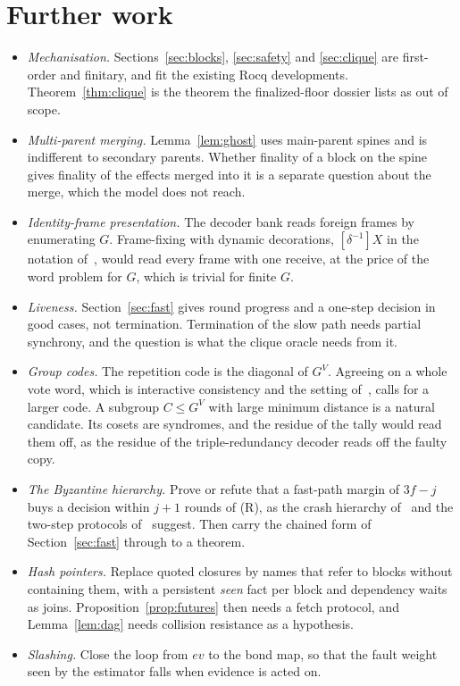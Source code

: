 \documentclass[11pt]{article}
\theoremstyle{definition}
\theoremstyle{remark}
\newcommand{\fr}[2]{[#1]#2}
\begin{document}
\section{Further work}\label{sec:further}

\begin{itemize}[leftmargin=1.5em]
\item \emph{Mechanisation.} Sections~\ref{sec:blocks}, \ref{sec:safety} and
  \ref{sec:clique} are first-order and finitary, and fit the existing Rocq
  developments. Theorem~\ref{thm:clique} is the theorem the finalized-floor
  dossier lists as out of scope.
\item \emph{Multi-parent merging.} Lemma~\ref{lem:ghost} uses main-parent
  spines and is indifferent to secondary parents. Whether finality of a block
  on the spine gives finality of the effects merged into it is a separate
  question about the merge, which the model does not reach.
\item \emph{Identity-frame presentation.} The decoder bank reads foreign frames
  by enumerating $G$. Frame-fixing with dynamic decorations,
  $\fr{\delta^{-1}}{X}$ in the notation of~\cite[\S7]{oriented}, would read
  every frame with one receive, at the price of the word problem for $G$,
  which is trivial for finite $G$.
\item \emph{Liveness.} Section~\ref{sec:fast} gives round progress and a
  one-step decision in good cases, not termination. Termination of the slow
  path needs partial synchrony, and the question is what the clique oracle
  needs from it.
\item \emph{Group codes.} The repetition code is the diagonal of
  $G^V$. Agreeing on a whole vote word, which is interactive consistency and
  the setting of~\cite{fmrr}, calls for a larger code. A subgroup
  $C\le G^V$ with large minimum distance is a natural candidate. Its cosets
  are syndromes, and the residue of the tally would read them off, as the
  residue of the triple-redundancy decoder reads off the faulty copy.
\item \emph{The Byzantine hierarchy.} Prove or refute that a fast-path margin
  of $3f-j$ buys a decision within $j+1$ rounds of (R), as the crash
  hierarchy of~\cite{mrr-sync} and the two-step protocols of~\cite{fab,ktz}
  suggest. Then carry the chained form of Section~\ref{sec:fast} through to a
  theorem.
\item \emph{Hash pointers.} Replace quoted closures by names that refer to
  blocks without containing them, with a persistent \emph{seen} fact per block
  and dependency waits as joins. Proposition~\ref{prop:futures} then needs a
  fetch protocol, and Lemma~\ref{lem:dag} needs collision resistance as a
  hypothesis.
\item \emph{Slashing.} Close the loop from $\mathit{ev}$ to the bond map, so
  that the fault weight seen by the estimator falls when evidence is acted on.
\end{itemize}
\end{document}
